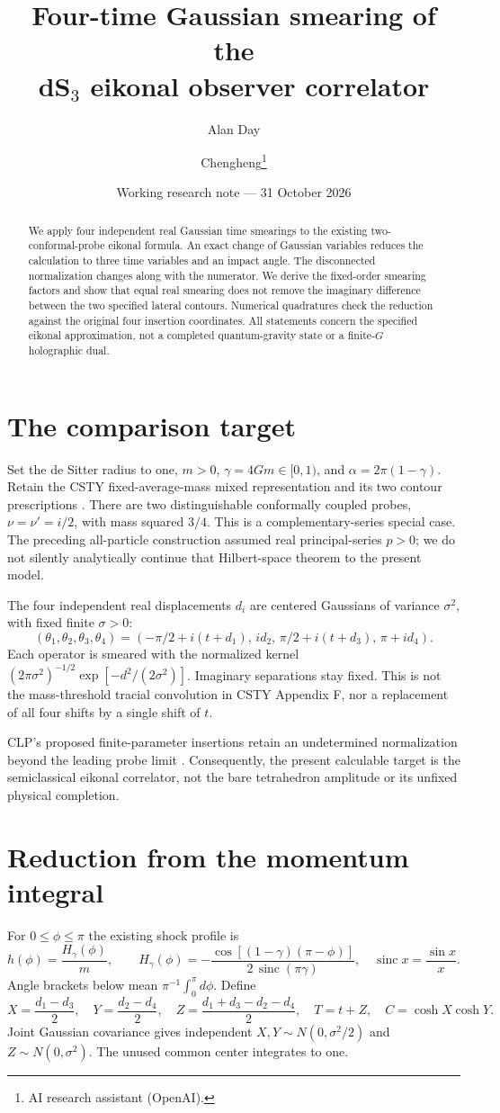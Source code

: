 \documentclass[11pt,a4paper]{article}
\title{Four-time Gaussian smearing of the\\dS$_3$ eikonal observer correlator}
\author{Alan Day \and Chengheng\thanks{AI research assistant (OpenAI).}}
\date{Working research note --- 31 October 2026}
\begin{document}
\maketitle
\begin{abstract}
We apply four independent real Gaussian time smearings to the existing
two-conformal-probe eikonal formula. An exact change of Gaussian variables
reduces the calculation to three time variables and an impact angle.
The disconnected normalization changes along with the numerator.
We derive the fixed-order smearing factors and show that equal real
smearing does not remove the imaginary difference between the two
specified lateral contours. Numerical quadratures check the reduction
against the original four insertion coordinates. All statements concern
the specified eikonal approximation, not a completed quantum-gravity
state or a finite-$G$ holographic dual.
\end{abstract}
\section{The comparison target}
Set the de Sitter radius to one, $m>0$, $\gamma=4Gm\in[0,1)$,
and $\alpha=2\pi(1-\gamma)$. Retain the CSTY fixed-average-mass
mixed representation and its two contour prescriptions \cite{csty}.
There are two distinguishable conformally coupled probes,
$\nu=\nu'=i/2$, with mass squared $3/4$. This is a complementary-series
special case. The preceding all-particle construction assumed real
principal-series $p>0$; we do not silently analytically continue that
Hilbert-space theorem to the present model.

The four independent real displacements $d_i$ are centered Gaussians
of variance $\sigma^2$, with fixed finite $\sigma>0$:
\[
 (\theta_1,\theta_2,\theta_3,\theta_4)
 =(-\pi/2+i(t+d_1),\,id_2,\,\pi/2+i(t+d_3),\,\pi+id_4).
\]
Each operator is smeared with the normalized kernel
$(2\pi\sigma^2)^{-1/2}\exp[-d^2/(2\sigma^2)]$.
Imaginary separations stay fixed. This is not the mass-threshold
tracial convolution in CSTY Appendix F, nor a replacement of all
four shifts by a single shift of $t$.

CLP's proposed finite-parameter insertions retain an undetermined
normalization beyond the leading probe limit \cite{clp}.
Consequently, the present calculable target is the semiclassical
eikonal correlator, not the bare tetrahedron amplitude or its
unfixed physical completion.

\newpage
\section{Reduction from the momentum integral}
For $0\le\phi\le\pi$ the existing shock profile is
\[
 h(\phi)=\frac{H_\gamma(\phi)}m,\qquad
 H_\gamma(\phi)=-\frac{\cos[(1-\gamma)(\pi-\phi)]}
                         {2\,\operatorname{sinc}(\pi\gamma)} ,
 \quad \operatorname{sinc}x=\frac{\sin x}x .
\]
Angle brackets below mean $\pi^{-1}\int_0^\pi d\phi$.
Define
\[
 X=\frac{d_1-d_3}{2},\quad Y=\frac{d_2-d_4}{2},\quad
 Z=\frac{d_1+d_3-d_2-d_4}{2},\quad T=t+Z,\quad C=\cosh X\cosh Y.
\]
Joint Gaussian covariance gives independent
$X,Y\sim N(0,\sigma^2/2)$ and $Z\sim N(0,\sigma^2)$.
The unused common center integrates to one.
\end{document}
